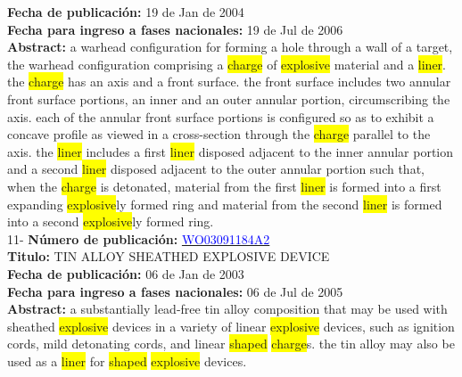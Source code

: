 \textbf{Fecha de publicación:} 19 de Jan de 2004\\ 
\textbf{Fecha para ingreso a fases nacionales:} 19 de Jul de 2006\\ 
\textbf{Abstract:} a warhead configuration for forming a hole through a wall of a target, the warhead configuration comprising a \colorbox{yellow}{\colorbox{yellow}{charge}} of \colorbox{yellow}{\colorbox{yellow}{explosive}} material and a \colorbox{yellow}{liner}. the \colorbox{yellow}{\colorbox{yellow}{charge}} has an axis and a front surface. the front surface includes two annular front surface portions, an inner and an outer annular portion, circumscribing the axis. each of the annular front surface portions is configured so as to exhibit a concave profile as viewed in a cross-section through the \colorbox{yellow}{\colorbox{yellow}{charge}} parallel to the axis. the \colorbox{yellow}{liner} includes a first \colorbox{yellow}{liner} disposed adjacent to the inner annular portion and a second \colorbox{yellow}{liner} disposed adjacent to the outer annular portion such that, when the \colorbox{yellow}{\colorbox{yellow}{charge}} is detonated, material from the first \colorbox{yellow}{liner} is formed into a first expanding \colorbox{yellow}{\colorbox{yellow}{explosive}}ly formed ring and material from the second \colorbox{yellow}{liner} is formed into a second \colorbox{yellow}{\colorbox{yellow}{explosive}}ly formed ring.\\ 
 

 \vspace{1cm}11- \textbf{Número de publicación:} \href{https://worldwide.espacenet.com/publicationDetails/biblio?DB=EPODOC&II=0&ND=3&adjacent=true&locale=en_EP&FT=D&date=20160331&CC=WO&NR=03091184A2&KC=#}{\textcolor{blue}{WO03091184A2}}\\ 
\textbf{Titulo:} TIN ALLOY SHEATHED EXPLOSIVE DEVICE\\ 
 
\textbf{Fecha de publicación:} 06 de Jan de 2003\\ 
\textbf{Fecha para ingreso a fases nacionales:} 06 de Jul de 2005\\ 
\textbf{Abstract:} a substantially lead-free tin alloy composition that may be used with sheathed \colorbox{yellow}{\colorbox{yellow}{explosive}} devices in a variety of linear \colorbox{yellow}{\colorbox{yellow}{explosive}} devices, such as ignition cords, mild detonating cords, and linear \colorbox{yellow}{shaped} \colorbox{yellow}{\colorbox{yellow}{charge}}s. the tin alloy may also be used as a \colorbox{yellow}{liner} for \colorbox{yellow}{shaped} \colorbox{yellow}{\colorbox{yellow}{explosive}} devices.\\ 
 
